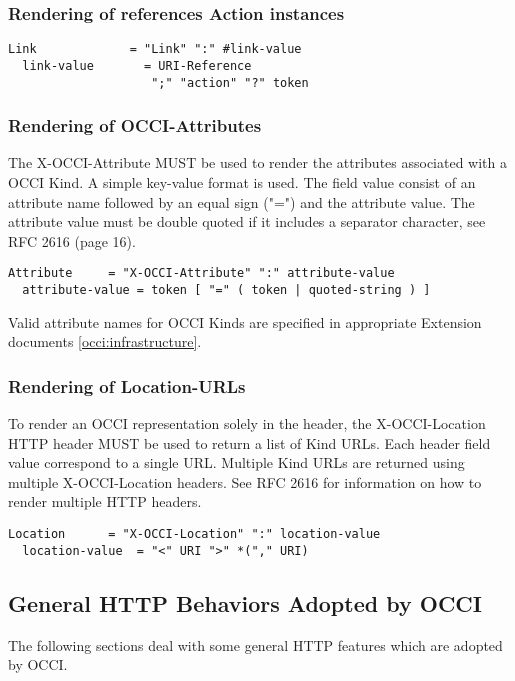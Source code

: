\documentclass[10pt,a4paper]{article}
\begin{document}
\subsubsection{Rendering of references Action instances}

\begin{verbatim}
Link             = "Link" ":" #link-value
  link-value       = URI-Reference
                    ";" "action" "?" token
\end{verbatim}

\subsubsection{Rendering of OCCI-Attributes}
The X-OCCI-Attribute MUST be used to render the attributes associated
with a OCCI Kind. A simple key-value format is used. The field value
consist of an attribute name followed by an equal sign ("=") and the
attribute value. The attribute value must be double quoted if it
includes a separator character, see RFC 2616 (page 16).

\begin{verbatim}
Attribute     = "X-OCCI-Attribute" ":" attribute-value
  attribute-value = token [ "=" ( token | quoted-string ) ]
\end{verbatim}

Valid attribute names for OCCI Kinds are specified in appropriate
Extension documents \ref{occi:infrastructure}.

\subsubsection{Rendering of Location-URLs}
To render an OCCI representation solely in the header, the
X-OCCI-Location HTTP header MUST be used to return a list of Kind
URLs. Each header field value correspond to a single URL. Multiple
Kind URLs are returned using multiple X-OCCI-Location headers. See RFC
2616 for information on how to render multiple HTTP headers.

\begin{verbatim}
Location      = "X-OCCI-Location" ":" location-value
  location-value  = "<" URI ">" *("," URI)
\end{verbatim}

\subsection{General HTTP Behaviors Adopted by OCCI}
The following sections deal with some general HTTP features which are
adopted by OCCI.
\end{document}
